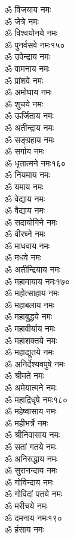 \begin{center}
\begin{multicols}{2}
\begin{flushleft}
ॐ विजयाय नमः\\
ॐ जेत्रे नमः\\
ॐ विश्वयोनये नमः\\
ॐ पुनर्वसवे नमः\hfill १५०\\
ॐ उपेन्द्राय नमः\\
ॐ वामनाय नमः\\
ॐ प्रांशवे नमः\\
ॐ अमोघाय नमः\\
ॐ शुचये नमः\\
ॐ ऊर्जिताय नमः\\
ॐ अतीन्द्राय नमः\\
ॐ सङ्ग्रहाय नमः\\
ॐ सर्गाय नमः\\
ॐ धृतात्मने नमः\hfill १६०\\
ॐ नियमाय नमः\\
ॐ यमाय नमः\\
ॐ वेद्याय नमः\\
ॐ वैद्याय नमः\\
ॐ सदायोगिने नमः\\
ॐ वीरघ्ने नमः\\
ॐ माधवाय नमः\\
ॐ मधवे नमः\\
ॐ अतीन्द्रियाय नमः\\
ॐ महामायाय नमः\hfill १७०\\
ॐ महोत्साहाय नमः\\
ॐ महाबलाय नमः\\
ॐ महाबुद्धये नमः\\
ॐ महावीर्याय नमः\\
ॐ महाशक्तये नमः\\
ॐ महाद्युतये नमः\\
ॐ अनिर्देश्यवपुषे नमः\\
ॐ श्रीमते नमः\\
ॐ अमेयात्मने नमः\\
ॐ महाद्रिधृषे नमः\hfill १८०\\
ॐ महेष्वासाय नमः\\
ॐ महीभर्त्रे नमः\\
ॐ श्रीनिवासाय नमः\\
ॐ सतां गतये नमः\\
ॐ अनिरुद्धाय नमः\\
ॐ सुरानन्दाय नमः\\
ॐ गोविन्दाय नमः\\
ॐ गोविदां पतये नमः\\
ॐ मरीचये नमः\\
ॐ दमनाय नमः\hfill १९०\\
ॐ हंसाय नमः\\

\end{flushleft}
\end{multicols}
\end{center}
